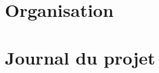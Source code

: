 \documentclass[12pt]{book} %
\begin{document}
%
%
% 
%

%
%

\part{Organisation}


\part{Journal du projet}




\end{document}
